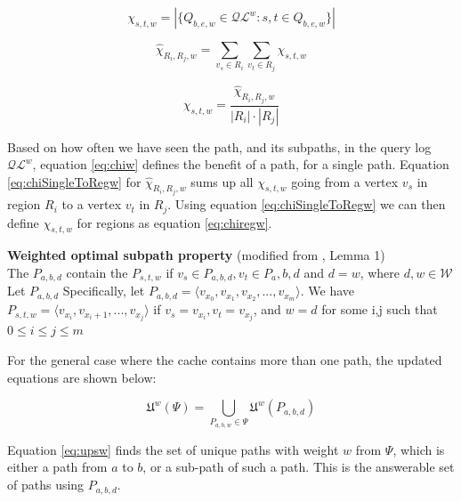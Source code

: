 \begin{equation} \label{eq:chiw}
\chi_{s,t,w} =  |\{ Q_{b,e,w} \in \mathcal{QL}^{w}: s, t \in Q_{b,e,w} \}|
\end{equation}

\begin{equation} \label{eq:chiSingleToRegw}
 \hat{\chi}_{R_i, R_j, w} = \sum\limits_{v_s \in R_i} \sum\limits_{v_t \in R_j} \chi_{s,t,w}
\end{equation}


\begin{equation} \label{eq:chiregw}
\chi_{s,t,w} = \frac{ \hat{\chi}_{R_i, R_j, w} }{|R_i| \cdot |R_j|}
\end{equation}



Based on how often we have seen the path, and its subpaths, in the query log $\mathcal{QL}^{w}$, equation \ref{eq:chiw} defines the benefit of a path, for a single path. Equation \ref{eq:chiSingleToRegw} for $\hat{\chi}_{R_i, R_j, w}$ sums up all $\chi_{s,t,w}$ going from a vertex $v_s$ in region $R_i$ to a vertex $v_t$ in $R_j$. Using equation \ref{eq:chiSingleToRegw} we can then define $\chi_{s,t,w}$ for regions as equation \ref{eq:chiregw}.




\begin{lemma} \label{lem:weightedoptimalproperty}
\textbf{Weighted optimal subpath property} (modified from \cite{thomsen2012}, Lemma 1)\\

The \spath $P_{a,b,d}$ contain the \spath $P_{s,t,w}$ if $v_s \in P_{a,b,d}, v_t \in {P_a,b,d}$ and $d = w$, where $d,w \in \mathcal{W}$
Let $P_{a,b,d}$
Specifically, let $P_{a,b,d} = \langle v_{x_0},v_{x_1},v_{x_2},...,v_{x_m}\rangle$. 
We have $P_{s,t,w} = \langle v_{x_i},v_{x_i+1},...,v_{x_j}\rangle$ if $v_s = v_{x_i}, v_t = v_{x_j}$, and $w = d$ for some i,j such that $0 \leq i \leq j \leq m$
\end{lemma}



For the general case where the cache contains more than one path, the updated equations are shown below:

\begin{equation} \label{eq:upsw}
 \mathfrak{U}^w(\Psi) = \bigcup\limits_{P_{a,b,w} \in \Psi} \mathfrak{U}^w(P_{a,b,d})
\end{equation}

Equation \ref{eq:upsw} finds the set of unique paths with weight $w$ from $\Psi$, which is either a path from $a$ to $b$, or a sub-path of such a path. This is the answerable set of paths using  $P_{a,b,d}$.


